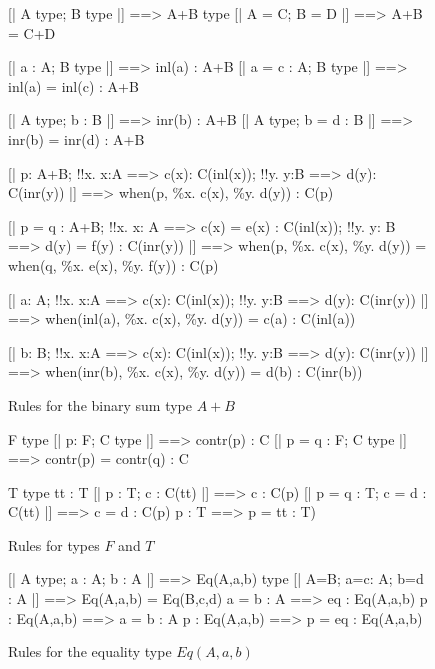 \begin{figure} 
\begin{ttbox}
       [| A type;  B type |] ==> A+B type
      [| A = C;  B = D |] ==> A+B = C+D

   [| a : A;  B type |] ==> inl(a) : A+B
  [| a = c : A;  B type |] ==> inl(a) = inl(c) : A+B

   [| A type;  b : B |] ==> inr(b) : A+B
  [| A type;  b = d : B |] ==> inr(b) = inr(d) : A+B

     [| p: A+B;
             !!x. x:A ==> c(x): C(inl(x));  
             !!y. y:B ==> d(y): C(inr(y))
          |] ==> when(p, \%x. c(x), \%y. d(y)) : C(p)

    [| p = q : A+B;
             !!x. x: A ==> c(x) = e(x) : C(inl(x));   
             !!y. y: B ==> d(y) = f(y) : C(inr(y))
          |] ==> when(p, \%x. c(x), \%y. d(y)) = 
                 when(q, \%x. e(x), \%y. f(y)) : C(p)

 [| a: A;
             !!x. x:A ==> c(x): C(inl(x));  
             !!y. y:B ==> d(y): C(inr(y))
          |] ==> when(inl(a), \%x. c(x), \%y. d(y)) = c(a) : C(inl(a))

 [| b: B;
             !!x. x:A ==> c(x): C(inl(x));  
             !!y. y:B ==> d(y): C(inr(y))
          |] ==> when(inr(b), \%x. c(x), \%y. d(y)) = d(b) : C(inr(b))
\end{ttbox}
\caption{Rules for the binary sum type $A+B$} \label{ctt-plus}
\end{figure}


\begin{figure} 
\begin{ttbox}
        F type
        [| p: F;  C type |] ==> contr(p) : C
       [| p = q : F;  C type |] ==> contr(p) = contr(q) : C

        T type
        tt : T
        [| p : T;  c : C(tt) |] ==> c : C(p)
       [| p = q : T;  c = d : C(tt) |] ==> c = d : C(p)
        p : T ==> p = tt : T)
\end{ttbox}

\caption{Rules for types $F$ and $T$} \label{ctt-ft}
\end{figure}


\begin{figure} 
\begin{ttbox}
       [| A type;  a : A;  b : A |] ==> Eq(A,a,b) type
      [| A=B;  a=c: A;  b=d : A |] ==> Eq(A,a,b) = Eq(B,c,d)
       a = b : A ==> eq : Eq(A,a,b)
       p : Eq(A,a,b) ==> a = b : A
       p : Eq(A,a,b) ==> p = eq : Eq(A,a,b)
\end{ttbox}
\caption{Rules for the equality type $Eq(A,a,b)$} \label{ctt-eq}
\end{figure}



